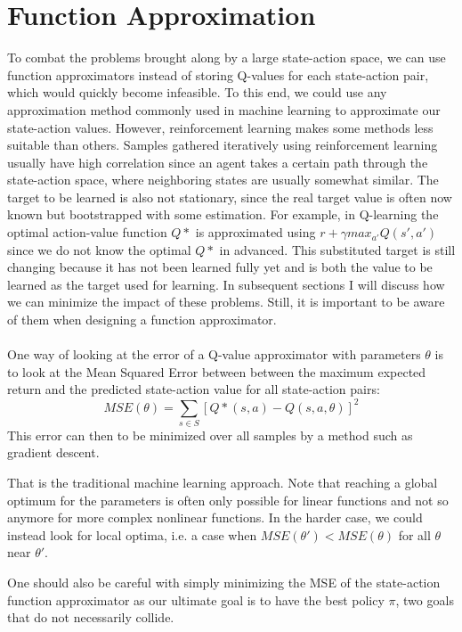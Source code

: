 \section{Function Approximation}
To combat the problems brought along by a large state-action space,
we can use function approximators instead of storing Q-values
for each state-action pair,
which would quickly become infeasible.
To this end,
we could use any approximation method commonly used in machine learning
to approximate our state-action values.
However, reinforcement learning makes some methods
less suitable than others.
Samples gathered iteratively using reinforcement learning
usually have high correlation since an agent
takes a certain path through
the state-action space,
where neighboring states are usually somewhat similar.
The target to be learned is also not stationary,
since the real target value is often now known
but bootstrapped with some estimation.
For example,
in Q-learning the optimal action-value function $Q*$
is approximated using $r+\gamma max_{a'}Q(s',a')$
since we do not know the optimal $Q*$ in advanced.
This substituted target is still changing
because it has not been learned fully yet
and is both the value to be learned
as the target used for learning.
In subsequent sections I will discuss
how we can minimize the impact of these problems.
Still, it is important to be aware of them
when designing a function approximator.

\paragraph{}
One way of looking at the error of a Q-value approximator
with parameters $\theta$ is to look at the Mean Squared Error
between between the maximum expected return and
the predicted state-action value for all state-action pairs:
$$MSE(\theta) = \sum_{s \in S}[Q*(s,a)-Q(s,a,\theta)]^2$$
This error can then to be minimized over all samples
by a method such as gradient descent.

That is the traditional machine learning approach.
Note that reaching a global optimum for the parameters
is often only possible for linear functions
and not so anymore for more complex nonlinear functions.
In the harder case, we could instead look for local optima,
i.e. a case when $MSE(\theta') < MSE(\theta)$
for all $\theta$ near $\theta'$.

One should also be careful with simply minimizing the MSE
of the state-action function approximator
as our ultimate goal is to have the best policy $\pi$,
two goals that do not necessarily collide.
